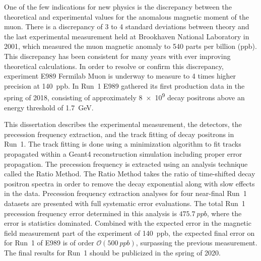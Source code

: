 


One of the few indications for new physics is the discrepancy between the theoretical and experimental values for the anomalous magnetic moment of the muon. There is a discrepancy of 3 to 4 standard deviations between theory and the last experimental measurement held at Brookhaven National Laboratory in 2001, which measured the muon magnetic anomaly \amu to 540 parts per billion (ppb). This discrepancy has been consistent for many years with ever improving theoretical calculations. In order to resolve or confirm this discrepancy, experiment E989 Fermilab Muon \gmtwo is underway to measure \amu to 4 times higher precision at \SI{140}{ppb}. In Run~1 E989 gathered its first production data in the spring of 2018, consisting of approximately \SI{8e9}{} decay positrons above an energy threshold of \SI{1.7}{\GeV}.

This dissertation describes the experimental measurement, the detectors, the precession frequency extraction, and the track fitting of decay positrons in Run~1. The track fitting is done using a \chisq minimization algorithm to fit tracks propagated within a Geant4 reconstruction simulation including proper error propagation. The precession frequency is extracted using an analysis technique called the Ratio Method. The Ratio Method takes the ratio of time-shifted decay positron spectra in order to remove the decay exponential along with slow effects in the data. Precession frequency extraction analyses for four near-final Run~1 datasets are presented with full systematic error evaluations. The total Run~1 precession frequency error determined in this analysis is $\SI{475.7}{ppb}$, where the error is statistics dominated. Combined with the expected error in the magnetic field measurement part of the experiment of \SI{140}{ppb}, the expected final error on \amu for Run~1 of E989 is of order $\mathcal{O}(\SI{500}{ppb})$, surpassing the previous measurement. The final results for Run~1 should be publicized in the spring of 2020.






